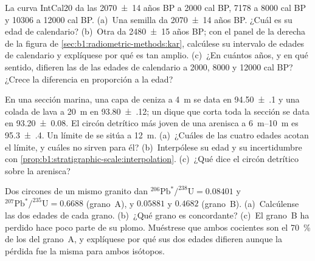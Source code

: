 \begin{exercise}[$\star\star$]\label{exo:b1:radiometric-methods:7}
La curva IntCal20 da las  \num[uncertainty-mode=separate]{2070 \pm 14} años BP a \num{2000}
cal BP, \num{7178} a \num{8000} cal BP y \num{10306} a \num{12000} cal BP.
(a)~Una semilla da \num[uncertainty-mode=separate]{2070 \pm 14} años BP. ¿Cuál es su edad de calendario? (b)~Otra da \num[uncertainty-mode=separate]{2480 \pm 15} años
BP; con el panel de la derecha de la figura de
\cref{sec:b1:radiometric-methods:kar}, calcúlese su intervalo de edades de calendario y explíquese por qué es tan amplio. (c)~¿En cuántos años, y en qué sentido, difieren las  de las edades de calendario a \num{2000}, \num{8000} y \num{12000} cal BP? ¿Crece la diferencia en proporción a la edad?
\end{exercise}

\begin{exercise}[$\star\star$]\label{exo:b1:radiometric-methods:8}
En una sección marina, una capa de ceniza a \qty{4}{m} se data en
\qty[uncertainty-mode=separate]{94.50(10)}{\Ma} y una colada de lava a \qty{20}{m} en \qty[uncertainty-mode=separate]{93.80(12)}{\Ma}; un dique que corta toda la
sección se data en \qty[uncertainty-mode=separate]{93.20(8)}{\Ma}. El circón detrítico más joven de una arenisca a \qtyrange{6}{10}{m} es
\qty[uncertainty-mode=separate]{95.3(4)}{\Ma}. Un límite de  se sitúa a \qty{12}{m}. (a)~¿Cuáles de las cuatro edades acotan el límite, y cuáles no sirven para él? (b)~Interpólese su edad y su incertidumbre con
\cref{prop:b1:stratigraphic-scale:interpolation}. (c)~¿Qué dice el circón detrítico sobre la arenisca?
\end{exercise}

\begin{exercise}[$\star\star$]\label{exo:b1:radiometric-methods:9}
Dos circones de un mismo granito dan
$^{206}\mathrm{Pb}^*/^{238}\mathrm{U} = 0.08401$ y
$^{207}\mathrm{Pb}^*/^{235}\mathrm{U} = 0.6688$ (grano~A), y $0.05881$ y
$0.4682$ (grano~B). (a)~Calcúlense las dos edades de cada grano. (b)~¿Qué grano es concordante? (c)~El grano~B ha perdido hace poco parte de su plomo. Muéstrese que ambos cocientes son el \qty{70}{\percent} de los del grano~A, y explíquese por qué sus dos edades difieren aunque la pérdida fue la misma para ambos isótopos.
\end{exercise}

